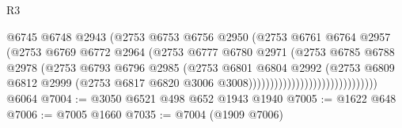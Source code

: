 \begin{lexlean}{R3}
\begin{coremodule}
                                              @6745
                                              @6748
                                              @2943
                                              (@2753
                                                @6753
                                                @6756
                                                @2950
                                                (@2753
                                                  @6761
                                                  @6764
                                                  @2957
                                                  (@2753
                                                    @6769
                                                    @6772
                                                    @2964
                                                    (@2753
                                                      @6777
                                                      @6780
                                                      @2971
                                                      (@2753
                                                        @6785
                                                        @6788
                                                        @2978
                                                        (@2753
                                                          @6793
                                                          @6796
                                                          @2985
                                                          (@2753
                                                            @6801
                                                            @6804
                                                            @2992
                                                            (@2753
                                                              @6809
                                                              @6812
                                                              @2999
                                                              (@2753
                                                                @6817
                                                                @6820
                                                                @3006
                                                                @3008))))))))))))))))))))))))))))))
    @6064
@7004 := @3050 @6521 @498 @652 @1943 @1940
@7005 := @1622 @648
@7006 := @7005 @1660
@7035 := @7004
    (@1909 @7006)

\end{coremodule}
\end{lexlean}

